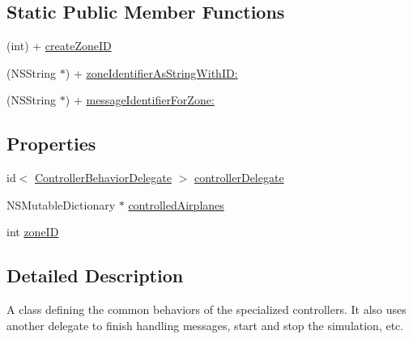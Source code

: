 \subsection*{\-Static \-Public \-Member \-Functions}
\begin{DoxyCompactItemize}
\item 
(int) + \hyperlink{interface_basic_controller_a632e9254a58cac373fd3d3487fea2378}{create\-Zone\-I\-D}
\item 
(\-N\-S\-String $\ast$) + \hyperlink{interface_basic_controller_aab42498e1e5013b83f086e2f33e73dec}{zone\-Identifier\-As\-String\-With\-I\-D\-:}
\item 
(\-N\-S\-String $\ast$) + \hyperlink{interface_basic_controller_a0cf74a74692c77d73ba701788f6551bf}{message\-Identifier\-For\-Zone\-:}
\end{DoxyCompactItemize}
\subsection*{\-Properties}
\begin{DoxyCompactItemize}
\item 
id$<$ \hyperlink{protocol_controller_behavior_delegate-p}{\-Controller\-Behavior\-Delegate} $>$ \hyperlink{interface_basic_controller_ac46747a2a5c535b5fd787a72d035cfc8}{controller\-Delegate}
\item 
\-N\-S\-Mutable\-Dictionary $\ast$ \hyperlink{interface_basic_controller_aa5144e6cc47e8988e9d14272a9c41e0d}{controlled\-Airplanes}
\item 
int \hyperlink{interface_basic_controller_a4a00fc7e962440447df674c6dea7077c}{zone\-I\-D}
\end{DoxyCompactItemize}


\subsection{\-Detailed \-Description}
\-A class defining the common behaviors of the specialized controllers. \-It also uses another delegate to finish handling messages, start and stop the simulation, etc. 

